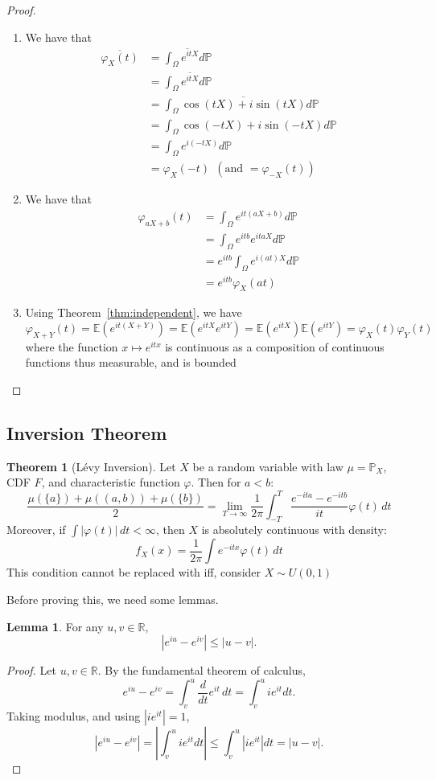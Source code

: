 \documentclass[11pt,a4paper]{article}
\theoremstyle{definition}
\newtheorem{theorem}{Theorem}[section]
\newtheorem{lemma}{Lemma}[section]
\begin{document}
\begin{proof}
\begin{enumerate}
\item We have that \begin{align*}
\overline{\varphi _X (t)} & = \overline{\int _{\Omega} e^{itX} d\mathbb{P}} \\ & = \int _{\Omega} \overline{e^{itX}} d\mathbb{P} \\ &= \int _{\Omega} \overline{\cos(tX) + i \sin (tX)} d\mathbb{P} \\ & = \int _{\Omega} \cos (-tX) + i \sin (-tX) d\mathbb{P} \\ & = \int _{\Omega} e^{i(-tX)} d\mathbb{P} \\ & = \varphi _X(-t) \ \  (\text{and } = \varphi_{-X}(t))
\end{align*}
\item We have that \begin{align*}
\varphi _{aX + b}(t) & = \int _{\Omega} e^{it (aX + b)}d \mathbb{P} \\ & = \int _{\Omega} e^{itb}e^{itaX} d\mathbb{P} \\ & = e^{itb} \int _{\Omega} e^{i (at)X} d\mathbb{P} \\ & = e^{itb} \varphi _X(at)
\end{align*}
\item Using Theorem~\ref{thm:independent}, we have \[
\varphi _{X+Y}(t) = \mathbb{E} (e^{it(X+Y)}) = \mathbb{E} (e^{itX}e^{itY}) = \mathbb{E}(e^{itX})\mathbb{E}(e^{itY}) = \varphi _X(t) \varphi_Y (t)
\]
where the function $x \mapsto e^{itx}$ is continuous as a composition of continuous functions thus measurable, and is bounded
\end{enumerate}
\end{proof}

\subsection{Inversion Theorem}

\begin{theorem}[Lévy Inversion]
Let $X$ be a random variable with law $\mu = \mathbb{P}_X$, CDF $F$, and characteristic function $\varphi$. Then for $a < b$:
\[\frac{\mu(\{a\}) + \mu((a,b)) + \mu(\{b\})}{2} = \lim_{T \to \infty} \frac{1}{2\pi} \int_{-T}^T \frac{e^{-ita} - e^{-itb}}{it} \varphi(t) \, dt\]
Moreover, if $\int |\varphi(t)| \, dt < \infty$, then $X$ is absolutely continuous with density:
\[f_X(x) = \frac{1}{2\pi} \int e^{-itx} \varphi(t) \, dt\]
This condition cannot be replaced with iff, consider $X \sim U(0,1)$
\end{theorem}
\noindent Before proving this, we need some lemmas.
\begin{lemma} \label{lem:a}
For any $u, v \in \mathbb{R}$,
\[
|e^{iu} - e^{iv}| \leq |u - v|.
\]
\end{lemma}
\begin{proof}
Let $u, v \in \mathbb{R}$. By the fundamental theorem of calculus,
\[
e^{iu} - e^{iv} = \int_{v}^{u} \frac{d}{dt} e^{it}\,dt = \int_{v}^{u} i e^{it} dt.
\]
Taking modulus, and using $|i e^{it}| = 1$,
\[
|e^{iu} - e^{iv}| = \left| \int_{v}^{u} i e^{it} dt \right| \leq \int_{v}^{u} |i e^{it}| dt = |u-v|.
\]
\end{proof}
\end{document}
